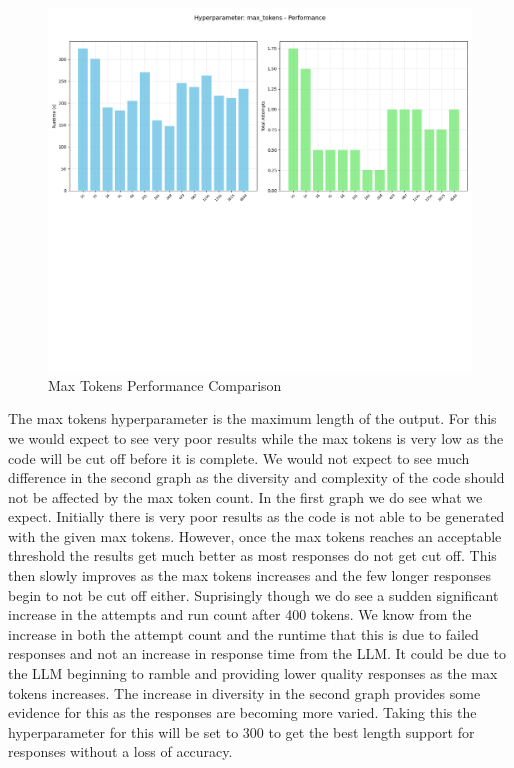 \documentclass[12pt]{extarticle}
\begin{document}
\begin{figure}[H]
\centering
\includegraphics[width=0.65\linewidth]{Images/Hyperparam_max_tokens_Performance.png}
\caption{Max Tokens Performance Comparison}
\label{fig:Complexity_Comparison_Threads}
\end{figure}

The max tokens hyperparameter is the maximum length of the output. For this we would expect to see very poor results while the max tokens is very low as the code will be cut off before it is complete. We would not expect to see much difference in the second graph as the diversity and complexity of the code should not be affected by the max token count. In the first graph we do see what we expect. Initially there is very poor results as the code is not able to be generated with the given max tokens. However, once the max tokens reaches an acceptable threshold the results get much better as most responses do not get cut off. This then slowly improves as the max tokens increases and the few longer responses begin to not be cut off either. Suprisingly though we do see a sudden significant increase in the attempts and run count after 400 tokens. We know from the increase in both the attempt count and the runtime that this is due to failed responses and not an increase in response time from the LLM. It could be due to the LLM beginning to ramble and providing lower quality responses as the max tokens increases. The increase in diversity in the second graph provides some evidence for this as the responses are becoming more varied. Taking this the hyperparameter for this will be set to 300 to get the best length support for responses without a loss of accuracy.
\end{document}
